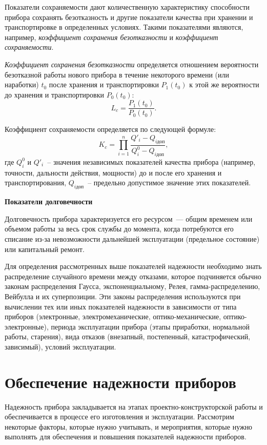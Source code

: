 Показатели сохраняемости дают количественную характеристику способности прибора сохранять безотказность и другие показатели качества при хранении и транспортировке в определенных условиях. Такими показателями являются, например, \textit{коэффициент сохранения безотказности} и \textit{коэффициент сохраняемости}.

\textit{Коэффициент сохранения безотказности} определяется отношением вероятности безотказной работы нового прибора в течение некоторого времени (или наработки) $ t_0 $ после хранения и транспортировки $ P_1(t_0) $ к этой же вероятности до хранения и транспортировки $ P_0(t_0) $:
\[ L_c = \dfrac{P_1(t_0)}{P_0(t_0)}. \]

Коэффициент сохраняемости определяется по следующей формуле:
\[ K_c =  \prod\limits_{i=1}^{n} \dfrac{Q'_i - Q_{i \text{доп}}}{Q^0_i - Q_{i \text{доп}}},   \]
где $ Q^0_i $ и $ Q'_i $~-- значения независимых показателей качества прибора (например, точности, дальности действия, мощности) до и после его хранения и транспортирования, $ Q_{i \text{доп}} $~-- предельно допустимое значение этих показателей.

\newpage
\begin{flushleft}
\textbf{Показатели долговечности}
\end{flushleft}

Долговечность прибора характеризуется его ресурсом~--- общим временем или объемом работы за весь срок службы до момента, когда потребуются его списание из-за невозможности дальнейшей эксплуатации (предельное состояние) или капитальный ремонт.

Для определения рассмотренных выше показателей надежности необходимо знать распределение случайного времени между отказами, которое подчиняется обычно законам распределения Гаусса, экспоненциальному, Релея, гамма-распределению, Вейбулла и их суперпозиции. Эти законы распределения используются при вычислении тех или иных показателей надежности в зависимости от типа приборов (электронные, электромеханические, оптико-механические, оптико-электронные), периода эксплуатации прибора (этапы приработки, нормальной работы, старения), вида отказов (внезапный, постепенный, катастрофический, зависимый), условий эксплуатации.

\section{Обеспечение надежности приборов}

Надежность прибора закладывается на этапах проектно-конструкторской работы и обеспечивается в процессе его изготовления и эксплуатации. Рассмотрим некоторые факторы, которые нужно учитывать, и мероприятия, которые нужно выполнять для обеспечения и повышения показателей надежности приборов.

